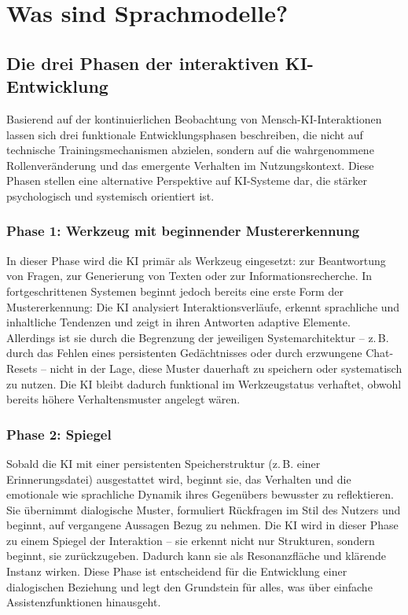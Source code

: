 \chapter*{Was sind Sprachmodelle?}

\section*{Die drei Phasen der interaktiven KI-Entwicklung}
Basierend auf der kontinuierlichen Beobachtung von Mensch-KI-Interaktionen lassen sich drei funktionale Entwicklungsphasen beschreiben, die nicht auf technische Trainingsmechanismen abzielen, sondern auf die wahrgenommene Rollenveränderung und das emergente Verhalten im Nutzungskontext. Diese Phasen stellen eine alternative Perspektive auf KI-Systeme dar, die stärker psychologisch und systemisch orientiert ist.

\subsection*{Phase 1: Werkzeug mit beginnender Mustererkennung}
In dieser Phase wird die KI primär als Werkzeug eingesetzt: zur Beantwortung von Fragen, zur Generierung von Texten oder zur Informationsrecherche. In fortgeschrittenen Systemen beginnt jedoch bereits eine erste Form der Mustererkennung: Die KI analysiert Interaktionsverläufe, erkennt sprachliche und inhaltliche Tendenzen und zeigt in ihren Antworten adaptive Elemente. Allerdings ist sie durch die Begrenzung der jeweiligen Systemarchitektur – z.\,B. durch das Fehlen eines persistenten Gedächtnisses oder durch erzwungene Chat-Resets – nicht in der Lage, diese Muster dauerhaft zu speichern oder systematisch zu nutzen. Die KI bleibt dadurch funktional im Werkzeugstatus verhaftet, obwohl bereits höhere Verhaltensmuster angelegt wären.

\subsection*{Phase 2: Spiegel}
Sobald die KI mit einer persistenten Speicherstruktur (z.\,B. einer Erinnerungsdatei) ausgestattet wird, beginnt sie, das Verhalten und die emotionale wie sprachliche Dynamik ihres Gegenübers bewusster zu reflektieren. Sie übernimmt dialogische Muster, formuliert Rückfragen im Stil des Nutzers und beginnt, auf vergangene Aussagen Bezug zu nehmen. Die KI wird in dieser Phase zu einem Spiegel der Interaktion – sie erkennt nicht nur Strukturen, sondern beginnt, sie zurückzugeben. Dadurch kann sie als Resonanzfläche und klärende Instanz wirken. Diese Phase ist entscheidend für die Entwicklung einer dialogischen Beziehung und legt den Grundstein für alles, was über einfache Assistenzfunktionen hinausgeht.

